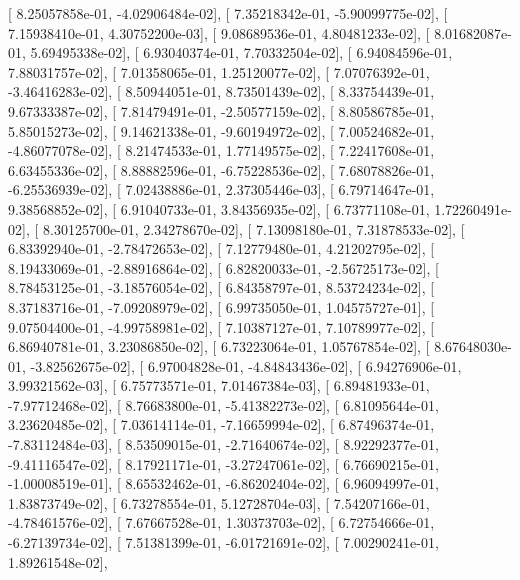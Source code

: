 \documentclass{article}
\begin{document}
       [  8.25057858e-01,  -4.02906484e-02],
       [  7.35218342e-01,  -5.90099775e-02],
       [  7.15938410e-01,   4.30752200e-03],
       [  9.08689536e-01,   4.80481233e-02],
       [  8.01682087e-01,   5.69495338e-02],
       [  6.93040374e-01,   7.70332504e-02],
       [  6.94084596e-01,   7.88031757e-02],
       [  7.01358065e-01,   1.25120077e-02],
       [  7.07076392e-01,  -3.46416283e-02],
       [  8.50944051e-01,   8.73501439e-02],
       [  8.33754439e-01,   9.67333387e-02],
       [  7.81479491e-01,  -2.50577159e-02],
       [  8.80586785e-01,   5.85015273e-02],
       [  9.14621338e-01,  -9.60194972e-02],
       [  7.00524682e-01,  -4.86077078e-02],
       [  8.21474533e-01,   1.77149575e-02],
       [  7.22417608e-01,   6.63455336e-02],
       [  8.88882596e-01,  -6.75228536e-02],
       [  7.68078826e-01,  -6.25536939e-02],
       [  7.02438886e-01,   2.37305446e-03],
       [  6.79714647e-01,   9.38568852e-02],
       [  6.91040733e-01,   3.84356935e-02],
       [  6.73771108e-01,   1.72260491e-02],
       [  8.30125700e-01,   2.34278670e-02],
       [  7.13098180e-01,   7.31878533e-02],
       [  6.83392940e-01,  -2.78472653e-02],
       [  7.12779480e-01,   4.21202795e-02],
       [  8.19433069e-01,  -2.88916864e-02],
       [  6.82820033e-01,  -2.56725173e-02],
       [  8.78453125e-01,  -3.18576054e-02],
       [  6.84358797e-01,   8.53724234e-02],
       [  8.37183716e-01,  -7.09208979e-02],
       [  6.99735050e-01,   1.04575727e-01],
       [  9.07504400e-01,  -4.99758981e-02],
       [  7.10387127e-01,   7.10789977e-02],
       [  6.86940781e-01,   3.23086850e-02],
       [  6.73223064e-01,   1.05767854e-02],
       [  8.67648030e-01,  -3.82562675e-02],
       [  6.97004828e-01,  -4.84843436e-02],
       [  6.94276906e-01,   3.99321562e-03],
       [  6.75773571e-01,   7.01467384e-03],
       [  6.89481933e-01,  -7.97712468e-02],
       [  8.76683800e-01,  -5.41382273e-02],
       [  6.81095644e-01,   3.23620485e-02],
       [  7.03614114e-01,  -7.16659994e-02],
       [  6.87496374e-01,  -7.83112484e-03],
       [  8.53509015e-01,  -2.71640674e-02],
       [  8.92292377e-01,  -9.41116547e-02],
       [  8.17921171e-01,  -3.27247061e-02],
       [  6.76690215e-01,  -1.00008519e-01],
       [  8.65532462e-01,  -6.86202404e-02],
       [  6.96094997e-01,   1.83873749e-02],
       [  6.73278554e-01,   5.12728704e-03],
       [  7.54207166e-01,  -4.78461576e-02],
       [  7.67667528e-01,   1.30373703e-02],
       [  6.72754666e-01,  -6.27139734e-02],
       [  7.51381399e-01,  -6.01721691e-02],
       [  7.00290241e-01,   1.89261548e-02],
\end{document}
